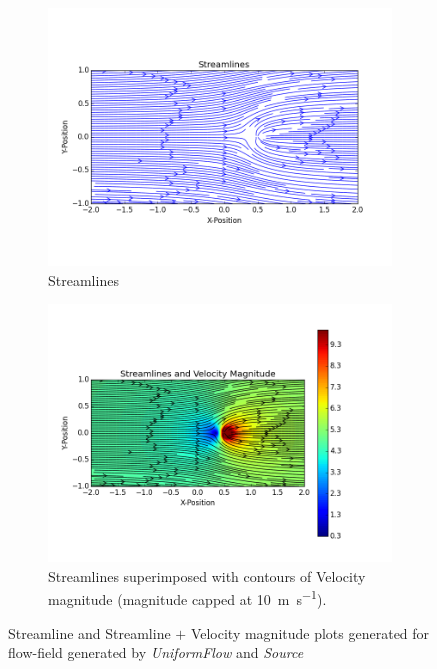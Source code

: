 \documentclass[10pt,a4paper]{article}
\begin{document}
\begin{figure}
\centering
\begin{subfigure}{0.48\textwidth}
    \includegraphics[width=1.0\textwidth]{Figures/Uniform_Source_SL}
  \caption{Streamlines}
\end{subfigure}
\hfill
\begin{subfigure}{0.48\textwidth}
    \includegraphics[width=1.0\textwidth]{Figures/Uniform_Source_SL_magU}
  \caption{Streamlines superimposed with contours of Velocity magnitude (magnitude capped at \SI{10}{\meter\per\second}).}
\end{subfigure}
\caption{Streamline and Streamline $+$ Velocity magnitude plots generated for flow-field generated by {\it UniformFlow} and {\it Source} }
\label{F_results_test}
\end{figure}
\end{document}
